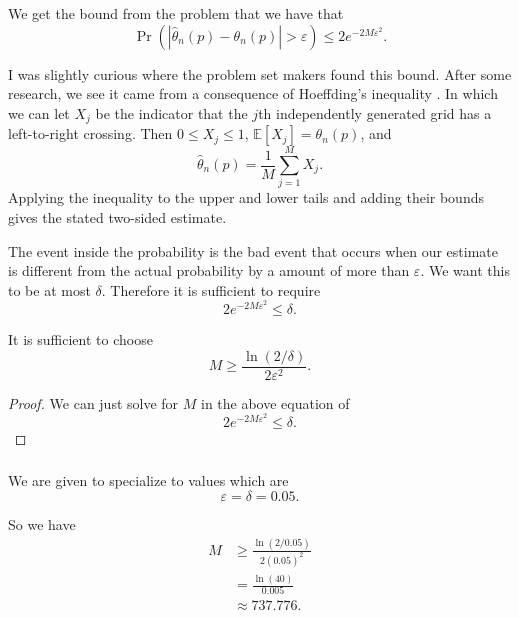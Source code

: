 \documentclass[11pt]{scrartcl}
\begin{document}
\begin{soln}
			We get the bound from the problem that we have that
			\[
			\Pr\left(
			\left|
			\widehat{\theta}_n(p)-\theta_n(p)
			\right|>\varepsilon
			\right)
			\le
			2e^{-2M\varepsilon^2}.
			\]
            \begin{remark}
                            I was slightly curious where the problem set makers found this bound. 
            After some research, we see it came from a consequence of Hoeffding's inequality \cite[Theorem~1, equation~(2.3)]{hoeffding}.
        			In which we can let $X_j$ be the indicator that the $j$th independently
			generated grid has a left-to-right crossing. Then
			$0\le X_j\le1$, $\mathbb E[X_j]=\theta_n(p)$, and
			\[
			\widehat{\theta}_n(p)=\frac1M\sum_{j=1}^{M}X_j.
			\]
			Applying the inequality to the upper and lower tails and adding
			their bounds gives the stated two-sided estimate.
        \end{remark}


			The event inside the probability is the bad event that occurs when our estimate is different from the actual probability by a amount of more than $\varepsilon$.
			We want this to be at most $\delta$.
			Therefore it is sufficient to require
			\[
			2e^{-2M\varepsilon^2}
			\le
			\delta.
			\]
			\begin{claim*}
				It is sufficient to choose
				\[
				\boxed{
					M
					\ge
					\frac{\ln(2/\delta)}{2\varepsilon^2}.
				}
				\]
			\end{claim*}
			
			\begin{proof}
				We can just solve for $M$ in the above equation of \[
			2e^{-2M\varepsilon^2}
			\le
			\delta.
			\]
			\end{proof}
			
			
			\subsubsection*{}
			
			We are given to specialize to values which are
			\[
			\varepsilon=\delta=0.05.
			\]
			
			So we have
			\begin{align*}
				M
				&\ge
				\frac{\ln(2/0.05)}
				{2(0.05)^2}\\
				&=
				\frac{\ln(40)}{0.005}\\
				&\approx
				737.776.
			\end{align*}
			

\end{soln}
\end{document}
